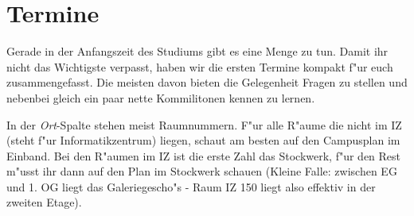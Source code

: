 \section{Termine}

Gerade in der Anfangszeit des Studiums gibt es eine Menge zu tun. Damit ihr
nicht das Wichtigste verpasst, haben wir die ersten Termine kompakt f"ur
euch zusammengefasst. Die meisten davon bieten die Gelegenheit Fragen zu
stellen und nebenbei gleich ein paar nette Kommilitonen kennen zu lernen.

In der \textit{Ort}-Spalte stehen meist Raumnummern. F"ur alle R"aume die nicht
im IZ (steht f"ur Informatikzentrum) liegen, schaut am besten auf den
Campusplan im Einband. Bei den R"aumen im IZ ist die erste Zahl das Stockwerk, f"ur
den Rest m"usst ihr dann auf den Plan im Stockwerk schauen (Kleine Falle:
zwischen EG und 1. OG liegt das Galeriegescho"s - Raum IZ 150 liegt also
effektiv in der zweiten Etage). \par

